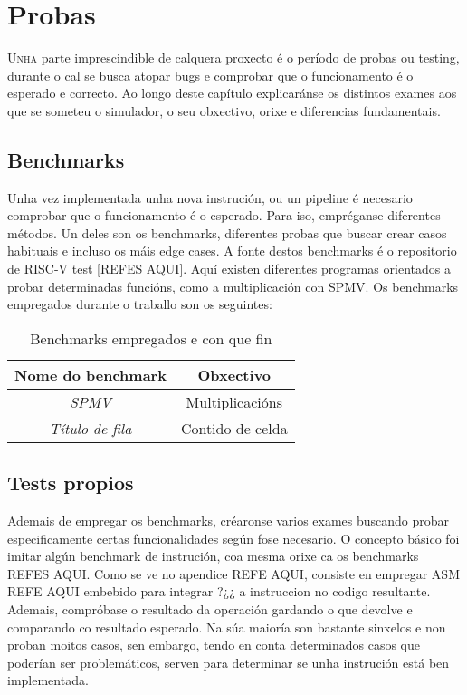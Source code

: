 \chapter{Probas}
\label{chap:probas}

\lettrine{U}{nha} parte imprescindible de calquera proxecto é o período de probas ou testing, durante o cal se busca atopar bugs e comprobar que o funcionamento é o esperado e correcto. Ao longo deste capítulo explicaránse os distintos exames aos que se someteu o simulador, o seu obxectivo, orixe e diferencias fundamentais.

\section{Benchmarks}\label{sec:benchmarks}
Unha vez implementada unha nova instrución, ou un pipeline é necesario comprobar que o funcionamento é o esperado. Para iso, empréganse diferentes métodos. Un deles son os benchmarks, diferentes probas que buscar crear casos habituais e incluso os máis edge cases. A fonte destos benchmarks  é o repositorio de RISC-V test [REFES AQUI]. Aquí existen diferentes programas orientados a probar determinadas funcións, como a multiplicación con SPMV. Os benchmarks empregados durante o traballo son os seguintes:
\begin{table}[hp!]
  \centering
  \begin{tabular}{c|c}
    \rowcolor{udcpink!25}
    \textbf{Nome do benchmark} & \textbf{Obxectivo} \\\hline
    \textit{SPMV} & Multiplicacións \\
    \textit{Título de fila} & Contido de celda \\
  \end{tabular}
  \caption{Benchmarks empregados e con que fin}
  \label{tab:benchmarks}
\end{table}

\section{Tests propios}\label{sec:tests}
Ademais de empregar os benchmarks, créaronse varios exames buscando probar especificamente certas funcionalidades según fose necesario. O concepto básico foi imitar algún benchmark de instrución, coa mesma orixe ca os benchmarks REFES AQUI. Como se ve no apendice REFE AQUI, consiste en empregar ASM REFE AQUI embebido para integrar ?¿¿ a instruccion no codigo resultante. Ademais, compróbase o resultado da operación gardando o que devolve e comparando co resultado esperado. Na súa maioría son bastante sinxelos e non proban moitos casos, sen embargo, tendo en conta determinados casos que poderían ser problemáticos, serven para determinar se unha instrución está ben implementada.


